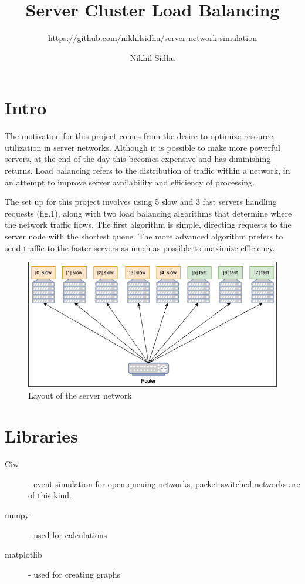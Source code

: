 \documentclass[12pt]{article}
\title{\bf{Server Cluster Load Balancing}}
\subtitle{https://github.com/nikhilsidhu/server-network-simulation}
\author{Nikhil Sidhu}
\begin{document}
\maketitle

\section{Intro}
	\par The motivation for this project comes from the desire to optimize resource utilization in server networks. Although it is possible to make more powerful servers, at the end of the day this becomes expensive and has diminishing returns. Load balancing refers to the distribution of traffic within a network, in an attempt to improve server availability and efficiency of processing. 
	
	The set up for this project involves using 5 slow and 3 fast servers handling requests (fig.1), along with two load balancing algorithms that determine where the network traffic flows. The first algorithm is simple, directing requests to the server node with the shortest queue. The more advanced algorithm prefers to send traffic to the faster servers as much as possible to maximize efficiency. 
	
	\begin{figure}[h]
		\centering
		\includegraphics[width=\textwidth]{server-network}
		\caption{Layout of the server network}
	\end{figure}

\section{Libraries}
	\begin{description}
		\item [Ciw] - event simulation for open queuing networks, packet-switched networks are of this kind.
		\item [numpy] - used for calculations
		\item [matplotlib] - used for creating graphs
	\end{description}
\end{document}
